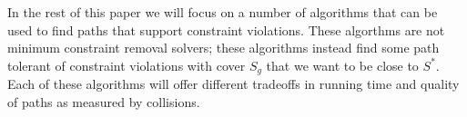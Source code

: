 In the rest of this paper we will focus on a number of algorithms that can be used to find paths that support constraint violations. These algorthms are not minimum constraint removal solvers; these algorithms instead find some path tolerant of constraint violations with cover $S_g$ that we want to be close to $S^{*}$. Each of these algorithms will offer different tradeoffs in running time and quality of paths as measured by collisions. 
